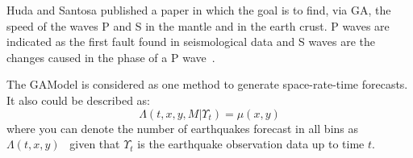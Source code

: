 Huda and Santosa \cite{ijse5762} published a paper in which the goal is to find, via GA, the speed of the waves P and S in the mantle and in the earth crust. P waves are indicated as the first fault found in seismological data and S waves are the changes caused in the phase of a P wave~\cite{ijse5762}. %


%	
%
%
The GAModel is considered as one method to generate
space-rate-time forecasts. It also could be described as:
\begin{equation}\label{gamodel}
\Lambda(t,x,y,M|\Upsilon_t) = \mu(x,y)
\end{equation}
where you can denote the number of earthquakes forecast in all bins 
as $\Lambda(t,x,y)$~\cite{zechar2010evaluating} given that $\Upsilon_t$ 
is the earthquake observation data up to time $t$.

